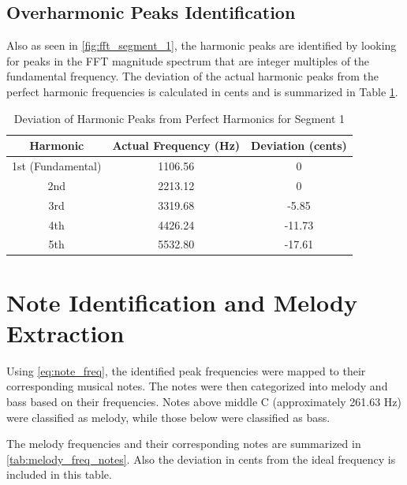 \subsection{Overharmonic Peaks Identification}

Also as seen in \autoref{fig:fft_segment_1}, the harmonic peaks are identified by looking for peaks in the FFT magnitude spectrum that are integer multiples of the fundamental frequency. The deviation of the actual harmonic peaks from the perfect harmonic frequencies is calculated in cents and is summarized in Table \ref{tab:deviation_segment_1}. 

\begin{table}[ht]
    \centering
    \caption{Deviation of Harmonic Peaks from Perfect Harmonics for Segment 1}
    \begin{tabular}{ccc}
        \hline
        Harmonic & Actual Frequency (Hz) & Deviation (cents) \\
        \hline
        1st (Fundamental) & 1106.56 & 0 \\
        2nd & 2213.12 & 0 \\
        3rd & 3319.68 & -5.85 \\
        4th & 4426.24 & -11.73 \\
        5th & 5532.80 & -17.61 \\
        \hline
    \end{tabular}
    \label{tab:deviation_segment_1}
\end{table}


\section{Note Identification and Melody Extraction}

Using \autoref{eq:note_freq}, the identified peak frequencies were mapped to their corresponding musical notes. The notes were then categorized into melody and bass based on their frequencies. Notes above middle C (approximately 261.63 Hz) were classified as melody, while those below were classified as bass.

The melody frequencies and their corresponding notes are summarized in \autoref{tab:melody_freq_notes}. Also the deviation in cents from the ideal frequency is included in this table.

